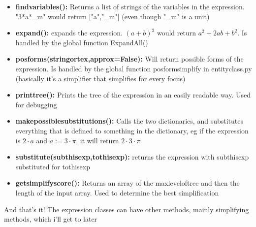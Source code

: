 \documentclass[11pt]{article}
\begin{document}
\begin{itemize}
\item \textbf{findvariables():} Returns a list of strings of the variables in the expression. "3*a*\_m" would return ["a","\_m"] (even though "\_m" is a unit)
\item \textbf{expand():} expands the expression. $(a+b)^2$ would return $a^2+2ab+b^2$. Is handled by the global function ExpandAll()
\item \textbf{posforms(stringortex,approx=False):} Will return possible forms of the expression. Is handled by the global function posformsimplify in entityclass.py (basically it's a simplifier that simplifies for every focus)
\item \textbf{printtree():} Prints the tree of the expression in an easily readable way. Used for debugging
\item \textbf{makepossiblesubstitutions():} Calls the two dictionaries, and substitutes everything that is defined to something in the dictionary, eg if the expression is $2\cdot a$ and $a:=3\cdot \pi$, it will return $2\cdot 3\cdot \pi$
\item \textbf{substitute(subthisexp,tothisexp):} returns the expression with subthisexp substituted for tothisexp
\item \textbf{getsimplifyscore():} Returns an array of the maxleveloftree and then the length of the input array. Used to determine the best simplification

\end{itemize}
And that's it! The expression classes can have other methods, mainly simplifying methods, which i'll get to later
\end{document}
